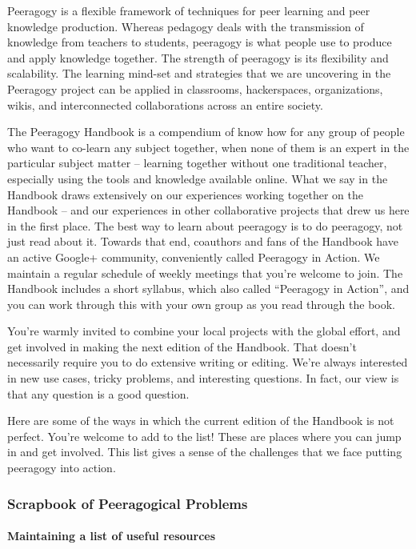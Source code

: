 Peeragogy is a flexible framework of techniques for peer learning and
peer knowledge production. Whereas pedagogy deals with the transmission
of knowledge from teachers to students, peeragogy is what people use to
produce and apply knowledge together. The strength of peeragogy is its
flexibility and scalability. The learning mind-set and strategies that
we are uncovering in the Peeragogy project can be applied in classrooms,
hackerspaces, organizations, wikis, and interconnected collaborations
across an entire society.

The Peeragogy Handbook is a compendium of know how for any group of
people who want to co-learn any subject together, when none of them is
an expert in the particular subject matter -- learning together without
one traditional teacher, especially using the tools and knowledge
available online. What we say in the Handbook draws extensively on our
experiences working together on the Handbook -- and our experiences in
other collaborative projects that drew us here in the first place. The
best way to learn about peeragogy is to do peeragogy, not just read
about it. Towards that end, coauthors and fans of the Handbook have an
active Google+ community, conveniently called Peeragogy in Action. We
maintain a regular schedule of weekly meetings that you're welcome to
join. The Handbook includes a short syllabus, which also called
``Peeragogy in Action'', and you can work through this with your own
group as you read through the book.

You're warmly invited to combine your local projects with the global
effort, and get involved in making the next edition of the Handbook.
That doesn't necessarily require you to do extensive writing or editing.
We're always interested in new use cases, tricky problems, and
interesting questions. In fact, our view is that any question is a good
question.

Here are some of the ways in which the current edition of the Handbook
is not perfect. You're welcome to add to the list! These are places
where you can jump in and get involved. This list gives a sense of the
challenges that we face putting peeragogy into action.

\hypertarget{scrapbook-of-peeragogical-problems}{%
\subsubsection{Scrapbook of Peeragogical
Problems}\label{scrapbook-of-peeragogical-problems}}

\hypertarget{maintaining-a-list-of-useful-resources}{%
\paragraph{Maintaining a list of useful
resources}\label{maintaining-a-list-of-useful-resources}}


